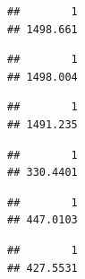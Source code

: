 \documentclass{article}
\begin{document}
\begin{verbatim}
##        1 
## 1498.661
\end{verbatim}

\begin{verbatim}
##        1 
## 1498.004
\end{verbatim}

\begin{verbatim}
##        1 
## 1491.235
\end{verbatim}

\begin{verbatim}
##        1 
## 330.4401
\end{verbatim}

\begin{verbatim}
##        1 
## 447.0103
\end{verbatim}

\begin{verbatim}
##        1 
## 427.5531
\end{verbatim}
\end{document}
